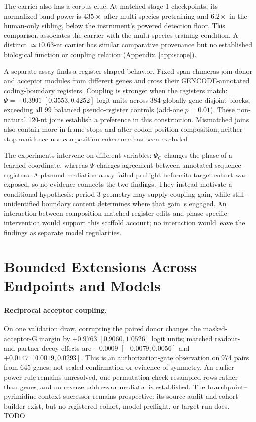 \documentclass{article}
\begin{document}
The carrier also has a corpus clue. At matched stage-1 checkpoints, its normalized band power is \(435\times\) after multi-species pretraining and \(6.2\times\) in the human-only sibling, below the instrument's powered detection floor. This comparison associates the carrier with the multi-species training condition. A distinct \(\simeq10.63\)-nt carrier has similar comparative provenance but no established biological function or coupling relation (Appendix~\ref{app:scope}).

A separate assay finds a register-shaped behavior. Fixed-span chimeras join donor and acceptor modules from different genes and cross their GENCODE-annotated coding-boundary registers. Coupling is stronger when the registers match: \(\Psi=+0.3901\;[0.3553,0.4252]\) logit units across 384 globally gene-disjoint blocks, exceeding all 99 balanced pseudo-register controls (add-one \(p=0.01\)). These non-natural 120-nt joins establish a preference in this construction. Mismatched joins also contain more in-frame stops and alter codon-position composition; neither stop avoidance nor composition coherence has been excluded.

The experiments intervene on different variables: \(\Psi_{\mathrm C}\) changes the phase of a learned coordinate, whereas \(\Psi\) changes agreement between annotated sequence registers. A planned mediation assay failed preflight before its target cohort was exposed, so no evidence connects the two findings. They instead motivate a conditional hypothesis: period-3 geometry may supply coupling gain, while still-unidentified boundary content determines where that gain is engaged. An interaction between composition-matched register edits and phase-specific intervention would support this scaffold account; no interaction would leave the findings as separate model regularities.

\section{Bounded Extensions Across Endpoints and Models}
\label{sec:extensions}

\paragraph{Reciprocal acceptor coupling.}
On one validation draw, corrupting the paired donor changes the masked-acceptor-G margin by \(+0.9763\;[0.9060,1.0526]\) logit units; matched readout- and partner-decoy effects are \(-0.0009\;[-0.0079,0.0056]\) and \(+0.0147\;[0.0019,0.0293]\). This is an authorization-gate observation on 974 pairs from 645 genes, not sealed confirmation or evidence of symmetry. An earlier power rule remains unresolved, one permutation check resampled rows rather than genes, and no reverse address or mediator is established. The branchpoint--pyrimidine-context successor remains prospective: its source audit and cohort builder exist, but no registered cohort, model preflight, or target run does. TODO
\end{document}
